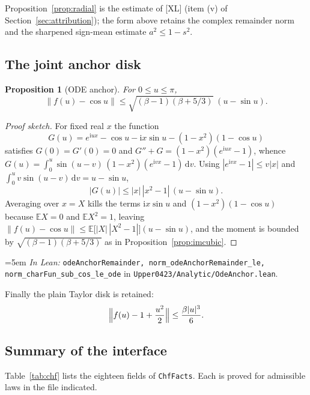 \documentclass[11pt,a4paper]{article}
\newtheorem{proposition}[theorem]{Proposition}
\theoremstyle{definition}
\newcommand{\EE}{\mathbb{E}}
\newcommand{\ii}{\mathrm{i}}
\newcommand{\dd}{\,\mathrm{d}}
\newcommand{\Lean}[1]{\texttt{#1}}
\newcommand{\file}[1]{\texttt{#1}}
\newcommand{\formal}[2]{%
  \par\smallskip
  \begingroup\small\raggedright\emergencystretch=5em
  \noindent\textit{In Lean:} \Lean{#1} in \file{#2}.\par
  \endgroup\smallskip}
\begin{document}
Proposition~\ref{prop:radial} is the estimate of [XL] (item (v) of
Section~\ref{sec:attribution}); the form above retains the complex remainder norm
and the sharpened sign-mean estimate $a^2\le 1-s^2$.

\subsection{The joint anchor disk}

\begin{proposition}[ODE anchor]
  \label{prop:ode}
  For $0\le u\le\pi$,
  \[
    \bigl\|f(u)-\cos u\bigr\|\le \sqrt{(\beta-1)(\beta+5/3)}\;(u-\sin u) .
  \]
\end{proposition}

\begin{proof}[Proof sketch]
  For fixed real $x$ the function
  \[
    G(u)=e^{\ii ux}-\cos u-\ii x\sin u-(1-x^2)(1-\cos u)
  \]
  satisfies $G(0)=G'(0)=0$ and $G''+G=(1-x^2)(e^{\ii ux}-1)$, whence
  $G(u)=\int_0^u\sin(u-v)\,(1-x^2)(e^{\ii vx}-1)\dd v$. Using
  $|e^{\ii vx}-1|\le v|x|$ and $\int_0^u v\sin(u-v)\dd v=u-\sin u$,
  \[
    |G(u)|\le |x|\,|x^2-1|\,(u-\sin u) .
  \]
  Averaging over $x=X$ kills the terms $\ii x\sin u$ and $(1-x^2)(1-\cos u)$
  because $\EE X=0$ and $\EE X^2=1$, leaving
  $\|f(u)-\cos u\|\le \EE\bigl[|X|\,|X^2-1|\bigr](u-\sin u)$, and the moment is
  bounded by $\sqrt{(\beta-1)(\beta+5/3)}$ as in
  Proposition~\ref{prop:imcubic}.
\end{proof}
\formal{odeAnchorRemainder, norm\_odeAnchorRemainder\_le, norm\_charFun\_sub\_cos\_le\_ode}{Upper0423/Analytic/OdeAnchor.lean}

Finally the plain Taylor disk is retained:
\begin{equation}
  \label{eq:quadratic}
  \Bigl\|f(u)-1+\frac{u^2}{2}\Bigr\|\le\frac{\beta|u|^3}{6} .
\end{equation}

\subsection{Summary of the interface}

Table~\ref{tab:chf} lists the eighteen fields of \Lean{ChfFacts}. Each is proved
for admissible laws in the file indicated.
\end{document}
